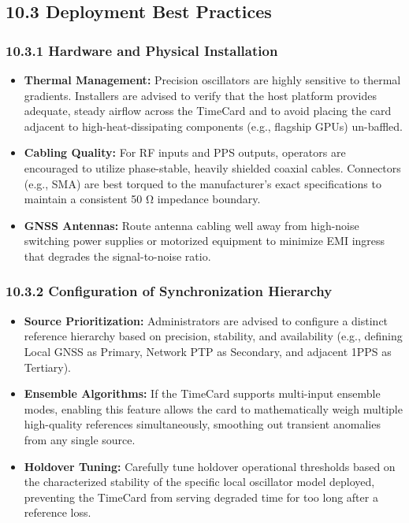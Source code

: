 \subsection{10.3 Deployment Best
Practices}\label{deployment-best-practices}

\subsubsection{10.3.1 Hardware and Physical
Installation}\label{hardware-and-physical-installation}

\begin{itemize}
\tightlist
\item
  \textbf{Thermal Management:} Precision oscillators are highly
  sensitive to thermal gradients. Installers are advised to verify that
  the host platform provides adequate, steady airflow across the
  TimeCard and to avoid placing the card adjacent to
  high-heat-dissipating components (e.g., flagship GPUs) un-baffled.
\item
  \textbf{Cabling Quality:} For RF inputs and PPS outputs, operators are
  encouraged to utilize phase-stable, heavily shielded coaxial cables.
  Connectors (e.g., SMA) are best torqued to the manufacturer's exact
  specifications to maintain a consistent 50 Ω impedance boundary.
\item
  \textbf{GNSS Antennas:} Route antenna cabling well away from
  high-noise switching power supplies or motorized equipment to minimize
  EMI ingress that degrades the signal-to-noise ratio.
\end{itemize}

\subsubsection{10.3.2 Configuration of Synchronization
Hierarchy}\label{configuration-of-synchronization-hierarchy}

\begin{itemize}
\tightlist
\item
  \textbf{Source Prioritization:} Administrators are advised to
  configure a distinct reference hierarchy based on precision,
  stability, and availability (e.g., defining Local GNSS as Primary,
  Network PTP as Secondary, and adjacent 1PPS as Tertiary).
\item
  \textbf{Ensemble Algorithms:} If the TimeCard supports multi-input
  ensemble modes, enabling this feature allows the card to
  mathematically weigh multiple high-quality references simultaneously,
  smoothing out transient anomalies from any single source.
\item
  \textbf{Holdover Tuning:} Carefully tune holdover operational
  thresholds based on the characterized stability of the specific local
  oscillator model deployed, preventing the TimeCard from serving
  degraded time for too long after a reference loss.
\end{itemize}

